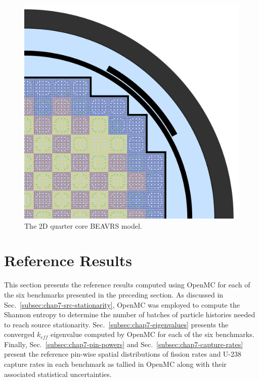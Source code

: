 \begin{figure}[h!]
  \centering
  \includegraphics[width=0.9\linewidth]{figures/benchmarks/quarter-core}
\vspace{2mm}
\caption[The 2D quarter core \ac{BEAVRS} model]{The 2D quarter core \ac{BEAVRS} model.}
\label{fig:chap7-full-core}
\end{figure}


\section{Reference Results}
\label{sec:chap7-ref-results}

This section presents the reference results computed using OpenMC for each of the six benchmarks presented in the preceding section. As discussed in Sec.~\ref{subsec:chap7-src-stationarity}, OpenMC was employed to compute the Shannon entropy to determine the number of batches of particle histories needed to reach source stationarity. Sec.~\ref{subsec:chap7-eigenvalues} presents the converged $k_{eff}$ eigenvalue computed by OpenMC for each of the six benchmarks. Finally, Sec.~\ref{subsec:chap7-pin-powers} and Sec.~\ref{subsec:chap7-capture-rates} present the reference pin-wise spatial distributions of fission rates and U-238 capture rates in each benchmark as tallied in OpenMC along with their associated statistical uncertainties.

